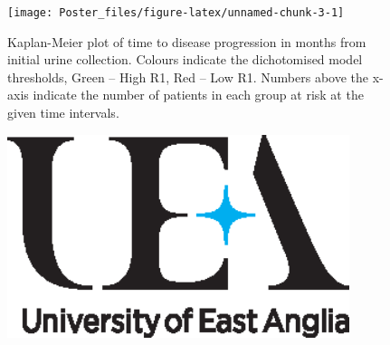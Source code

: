 \documentclass[article,30pt,extrafontsizes]{memoir}
\begin{document}
\begin{flushleft}
\begin{adjmulticols*}{2}{10mm}{10mm}
{\begin{figure}

{\centering \texttt{[image: Poster\_files/figure-latex/unnamed-chunk-3-1]} 

}

\caption{Kaplan-Meier plot of time to disease progression in months from initial urine collection. Colours indicate the dichotomised model thresholds, Green – High R1, Red – Low R1. Numbers above the x-axis indicate the number of patients in each group at risk at the given time intervals.}\label{fig:unnamed-chunk-3}
\end{figure}

\vspace{-45mm}
\footnotesize\printbibliography

\vspace{5mm}
\begin{figure}
\includegraphics[width = 10cm,right]{UEA_NEW_BRAND_Cyan_N_A}
\end{figure}
}
\end{adjmulticols*}
\end{flushleft}
\end{document}
